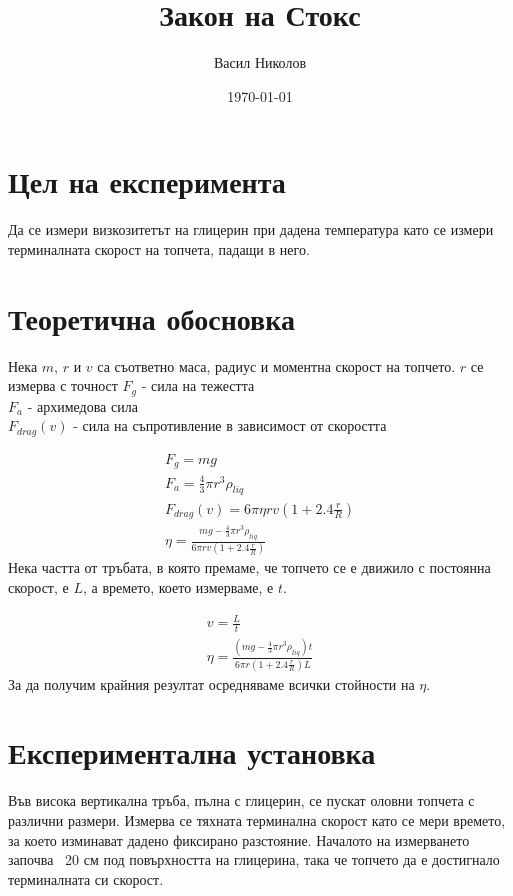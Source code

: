 \documentclass[aps, prb, twocolumn, a4paper]{revtex4-2}
\begin{document}
\title{Закон на Стокс}
\author{Васил Николов}
\date{\today}

\maketitle

\section{Цел на експеримента}
Да се измери визкозитетът на глицерин при дадена температура като се измери терминалната скорост на топчета, падащи в него.

\section{Теоретична обосновка}

Нека $m$, $r$ и $v$ са съответно маса, радиус и моментна скорост на топчето. $r$ се измерва с точност 
$F_g$ - сила на тежестта\\
$F_a$ - архимедова сила \\ 
$F_{drag}(v)$ - сила на съпротивление в зависимост от скоростта 

\begin{gather*}
    F_g = mg \\
    F_a = \frac{4}{3}\pi r^3\rho_{liq} \\
    F_{drag}(v) = 6\pi\eta rv(1 + 2.4\frac{r}{R})\\
    \eta = \frac{mg-\frac{4}{3}\pi r^3\rho_{liq}}{6\pi rv(1+2.4\frac{r}{R})}
\end{gather*}
Нека частта от тръбата, в която премаме, че топчето се е движило с постоянна скорост, е $L$, а времето, което измерваме, е $t$. 

\begin{gather*}
    v = \frac{L}{t} \\
    \eta = \frac{(mg-\frac{4}{3}\pi r^3\rho_{liq})t}{6\pi r(1+2.4\frac{r}{R})L}
\end{gather*}
За да получим крайния резултат осредняваме всички стойности на $\eta$. 

\section{Експериментална установка}

Във висока вертикална тръба, пълна с глицерин, се пускат оловни топчета с различни размери. Измерва се тяхната терминална скорост като се мери времето, за което изминават дадено фиксирано разстояние. Началото на измерването започва ~20 см под повърхността на глицерина, така че топчето да е достигнало терминалната си скорост.
\end{document}
